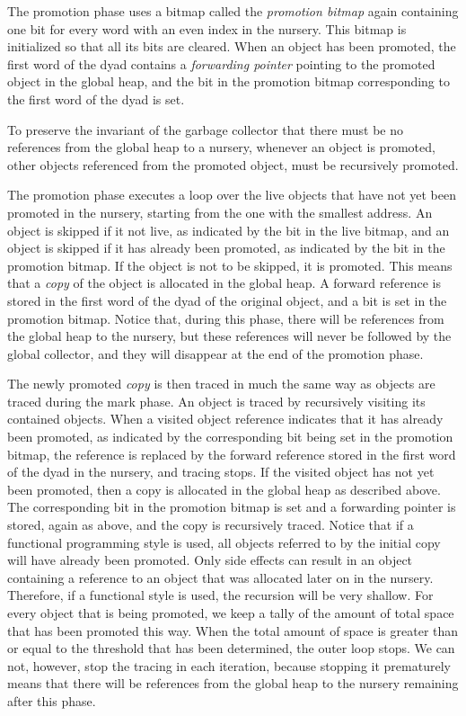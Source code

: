 The promotion phase uses a bitmap called the \emph{promotion bitmap}
again containing one bit for every word with an even index in the
nursery.  This bitmap is initialized so that all its bits are cleared.
When an object has been promoted, the first word of the dyad contains
a \emph{forwarding pointer} pointing to the promoted object in the
global heap, and the bit in the promotion bitmap corresponding to the
first word of the dyad is set.

To preserve the invariant of the garbage collector that there must be
no references from the global heap to a nursery, whenever an object is
promoted, other objects referenced from the promoted object, must be
recursively promoted.

The promotion phase executes a loop over the live objects that have
not yet been promoted in the nursery, starting from the one with the
smallest address.  An object is skipped if it not live, as indicated
by the bit in the live bitmap, and an object is skipped if it has
already been promoted, as indicated by the bit in the promotion
bitmap.  If the object is not to be skipped, it is promoted.  This
means that a \emph{copy} of the object is allocated in the global
heap.  A forward reference is stored in the first word of the dyad of
the original object, and a bit is set in the promotion bitmap.  Notice
that, during this phase, there will be references from the global heap
to the nursery, but these references will never be followed by the
global collector, and they will disappear at the end of the promotion
phase.

The newly promoted \emph{copy} is then traced in much the same way as
objects are traced during the mark phase.  An object is traced by
recursively visiting its contained objects.  When a visited object
reference indicates that it has already been promoted, as indicated by
the corresponding bit being set in the promotion bitmap, the reference
is replaced by the forward reference stored in the first word of the
dyad in the nursery, and tracing stops.  If the visited object has
not yet been promoted, then a copy is allocated in the global heap as
described above.  The corresponding bit in the promotion bitmap is set
and a forwarding pointer is stored, again as above, and the copy is
recursively traced.  Notice that if a functional programming style is
used, all objects referred to by the initial copy will have already
been promoted.  Only side effects can result in an object containing a
reference to an object that was allocated later on in the nursery.
Therefore, if a functional style is used, the recursion will be very
shallow.  For every object that is being promoted, we keep a tally of
the amount of total space that has been promoted this way.  When the
total amount of space is greater than or equal to the threshold that
has been determined, the outer loop stops.  We can not, however, stop
the tracing in each iteration, because stopping it prematurely means
that there will be references from the global heap to the nursery
remaining after this phase.

